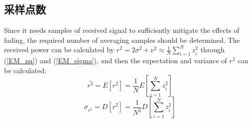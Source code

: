 \subsection{采样点数}
\label{sec:number}

Since it needs samples of received signal to sufficiently mitigate the effects of fading, the required number of averaging samples should be determined. The received power can be calculated by $r^2=2\sigma^2+\nu^2\approx\frac{1}{N}\sum_{i=1}^N z_i^2$ through (\ref{EM_nu}) and (\ref{EM_sigma}), and then the expectation and variance of $r^2$ can be calculated:
\begin{equation}
    \bar{r^2}=E\left[r^2\right]=\frac{1}{N}E\left[\sum_{i=1}^{N}z_i^2\right]
\label{number_mean}
\end{equation}
\begin{equation}
    \sigma_{\bar{r^2}}=D\left[r^2\right]=\frac{1}{N^2}D\left[\sum_{i=1}^{N}z_i^2\right]
\label{number_sigma}
\end{equation}


